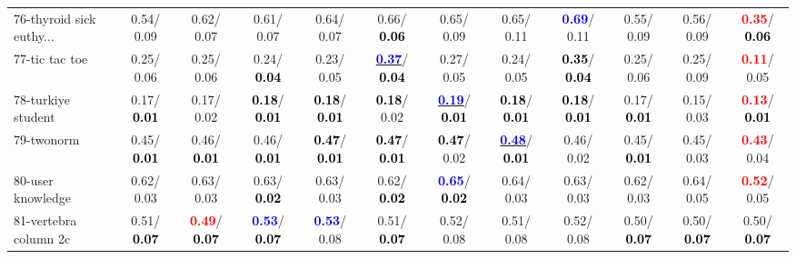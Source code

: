 \begin{table}[h]
\begin{center}
{\begin{tabular}{lc|c|c|c|c|c|c|c|c|c|c}
76-thyroid sick euthy... &   0.54/  0.09 &   0.62/  0.07 &   0.61/  0.07 &   0.64/  0.07 &   0.66/\textcolor{black}{\textbf{  0.06}} &   0.65/  0.09 &   0.65/  0.11 & \textcolor{blue}{\textbf{  0.69}}/  0.11 &   0.55/  0.09 &   0.56/  0.09 & \textcolor{red}{\textbf{  0.35}}/\textcolor{black}{\textbf{  0.06}} \\
77-tic tac toe &   0.25/  0.06 &   0.25/  0.06 &   0.24/\textcolor{black}{\textbf{  0.04}} &   0.23/  0.05 & \underline{\textcolor{blue}{\textbf{  0.37}}}/\textcolor{black}{\textbf{  0.04}} &   0.27/  0.05 &   0.24/  0.05 & \textcolor{black}{\textbf{  0.35}}/\textcolor{black}{\textbf{  0.04}} &   0.25/  0.06 &   0.25/  0.09 & \textcolor{red}{\textbf{  0.11}}/  0.05 \\
78-turkiye student &   0.17/\textcolor{black}{\textbf{  0.01}} &   0.17/  0.02 & \textcolor{black}{\textbf{  0.18}}/\textcolor{black}{\textbf{  0.01}} & \textcolor{black}{\textbf{  0.18}}/\textcolor{black}{\textbf{  0.01}} & \textcolor{black}{\textbf{  0.18}}/  0.02 & \underline{\textcolor{blue}{\textbf{  0.19}}}/\textcolor{black}{\textbf{  0.01}} & \textcolor{black}{\textbf{  0.18}}/\textcolor{black}{\textbf{  0.01}} & \textcolor{black}{\textbf{  0.18}}/\textcolor{black}{\textbf{  0.01}} &   0.17/\textcolor{black}{\textbf{  0.01}} &   0.15/  0.03 & \textcolor{red}{\textbf{  0.13}}/\textcolor{black}{\textbf{  0.01}} \\ \hline
79-twonorm &   0.45/\textcolor{black}{\textbf{  0.01}} &   0.46/\textcolor{black}{\textbf{  0.01}} &   0.46/\textcolor{black}{\textbf{  0.01}} & \textcolor{black}{\textbf{  0.47}}/\textcolor{black}{\textbf{  0.01}} & \textcolor{black}{\textbf{  0.47}}/\textcolor{black}{\textbf{  0.01}} & \textcolor{black}{\textbf{  0.47}}/  0.02 & \underline{\textcolor{blue}{\textbf{  0.48}}}/\textcolor{black}{\textbf{  0.01}} &   0.46/  0.02 &   0.45/\textcolor{black}{\textbf{  0.01}} &   0.45/  0.03 & \textcolor{red}{\textbf{  0.43}}/  0.04 \\
80-user knowledge &   0.62/  0.03 &   0.63/  0.03 &   0.63/\textcolor{black}{\textbf{  0.02}} &   0.63/  0.03 &   0.62/\textcolor{black}{\textbf{  0.02}} & \textcolor{blue}{\textbf{  0.65}}/\textcolor{black}{\textbf{  0.02}} &   0.64/  0.03 &   0.63/  0.03 &   0.62/  0.03 &   0.64/  0.05 & \textcolor{red}{\textbf{  0.52}}/  0.05 \\
81-vertebra column 2c &   0.51/\textcolor{black}{\textbf{  0.07}} & \textcolor{red}{\textbf{  0.49}}/\textcolor{black}{\textbf{  0.07}} & \textcolor{blue}{\textbf{  0.53}}/\textcolor{black}{\textbf{  0.07}} & \textcolor{blue}{\textbf{  0.53}}/  0.08 &   0.51/\textcolor{black}{\textbf{  0.07}} &   0.52/  0.08 &   0.51/  0.08 &   0.52/  0.08 &   0.50/\textcolor{black}{\textbf{  0.07}} &   0.50/\textcolor{black}{\textbf{  0.07}} &   0.50/\textcolor{black}{\textbf{  0.07}} \\

\end{tabular}}
\end{center}
\end{table}
